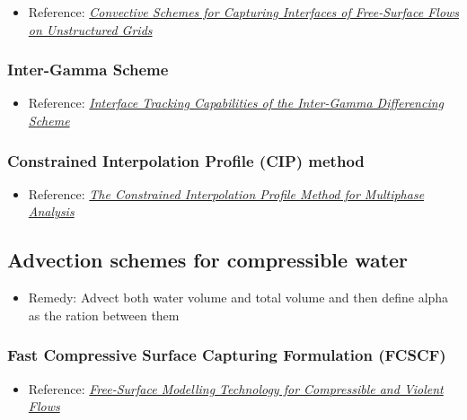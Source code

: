 \documentclass[]{report}
\begin{document}
\begin{itemize}
    \item Reference: \textit{\href{http://webfea-lb.fea.aub.edu.lb/cfd/pdfs/publications2/STACS-Complete.pdf}{Convective Schemes for Capturing Interfaces of Free-Surface Flows on Unstructured Grids}}
\end{itemize}

\subsubsection{Inter-Gamma Scheme}

\begin{itemize}
    \item Reference: \textit{\href{http://powerlab.fsb.hr/ped/kturbo/openfoam/docs/InterTrack.pdf}{Interface Tracking Capabilities of the Inter-Gamma Differencing Scheme}}
\end{itemize}

\subsubsection{Constrained Interpolation Profile (CIP) method}


\begin{itemize}
    \item Reference: \textit{\href{http://www.mech.titech.ac.jp/~ryuutai/paper/JCP2001CIPReviewYabe.pdf}{The Constrained Interpolation Profile Method for Multiphase Analysis}}
\end{itemize}

\subsection{Advection schemes for compressible water}

\begin{itemize}
    \item Remedy: Advect both water volume and total volume and then define alpha as the ration between them
\end{itemize}

\subsubsection{Fast Compressive Surface Capturing Formulation (FCSCF)}

\begin{itemize}
    \item Reference: \textit{\href{http://researchspace.csir.co.za/dspace/bitstream/10204/5282/1/Heyns_2011.pdf}{Free-Surface Modelling Technology for Compressible and Violent Flows}}
\end{itemize}
\end{document}
